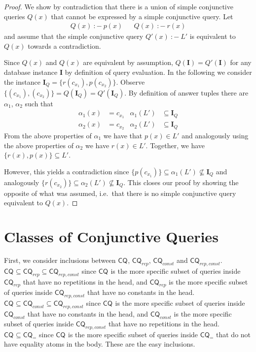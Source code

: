 \documentclass[a4paper,12pt]{article}
\newcommand{\cq}[1]{\ensuremath{\mathsf{CQ}_{#1}}}
\newcommand{\query}[3]{\ensuremath{{#1}({#2})\:{:}{-}\:{#3}}}
\begin{document}
\begin{proof}
We show by contradiction that there is a union of simple conjunctive queries $Q(x)$ that cannot be expressed by a simple conjunctive query. Let
\begin{align*}
\query{Q}{x}{p(x)} && \query{Q}{x}{r(x)}
\end{align*}
and assume that the simple conjunctive query $\query{Q'}{x}{L'}$ is equivalent to $Q(x)$ towards a contradiction.

Since $Q(x)$ and $Q(x)$ are equivalent by assumption, $Q(\textbf{I}) = Q'(\textbf{I})$ for any database instance $\textbf{I}$ by definition of query evaluation. In the following we consider the instance $\textbf{I}_Q = \{ r(c_{x_1}), p(c_{x_2}) \}$. Observe $\{ (c_{x_1}), (c_{x_2}) \} = Q(\textbf{I}_Q) = Q'(\textbf{I}_Q)$. By definition of answer tuples there are $\alpha_1$, $\alpha_2$ such that
\begin{align*}
\alpha_1(x) &= c_{x_1} &
\alpha_1(L') &\subseteq \textbf{I}_Q \\
\alpha_2(x) &= c_{x_2} &
\alpha_2(L') &\subseteq \textbf{I}_Q
\end{align*}
From the above properties of $\alpha_1$ we have that $p(x) \in L'$ and analogously using the above properties of $\alpha_2$ we have $r(x) \in L'$. Together, we have $\{ r(x), p(x) \} \subseteq L'$.

However, this yields a contradiction since $\{p(c_{x_1})\} \subseteq \alpha_1(L') \not \subseteq \textbf{I}_Q$ and analogously $\{r(c_{x_2})\} \subseteq \alpha_2(L') \not \subseteq \textbf{I}_Q$. This closes our proof by showing the opposite of what was assumed, i.e.\ that there is no simple conjunctive query equivalent to $Q(x)$.
\end{proof}

\section{Classes of Conjunctive Queries}

First, we consider inclusions between \cq{}, \cq{rep}, \cq{const} and \cq{rep,const}. $\cq{} \subseteq \cq{rep} \subseteq \cq{rep,const}$ since \cq{} is the more specific subset of queries inside \cq{rep} that have no repetitions in the head, and \cq{rep} is the more specific subset of queries inside \cq{rep,const} that have no constants in the head. $\cq{} \subseteq \cq{const} \subseteq \cq{rep,const}$ since \cq{} is the more specific subset of queries inside \cq{const} that have no constants in the head, and \cq{const} is the more specific subset of queries inside \cq{rep,const} that have no repetitions in the head. $\cq{} \subseteq \cq{=}$ since \cq{} is the more specific subset of queries inside \cq{=} that do not have equality atoms in the body. These are the easy inclusions.
\end{document}
